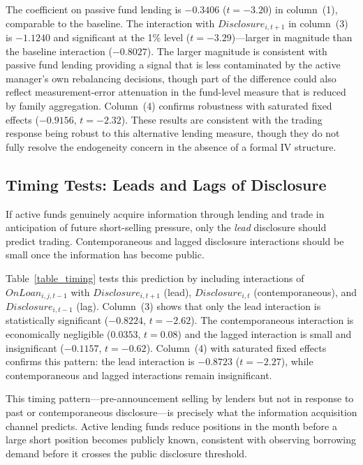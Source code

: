 The coefficient on passive fund lending is $-0.3406$ ($t = -3.20$) in column~(1), comparable to the baseline. The interaction with $\mathit{Disclosure}_{i,t+1}$ in column~(3) is $-1.1240$ and significant at the 1\% level ($t = -3.29$)---larger in magnitude than the baseline interaction ($-0.8027$). The larger magnitude is consistent with passive fund lending providing a signal that is less contaminated by the active manager's own rebalancing decisions, though part of the difference could also reflect measurement-error attenuation in the fund-level measure that is reduced by family aggregation. Column~(4) confirms robustness with saturated fixed effects ($-0.9156$, $t = -2.32$). These results are consistent with the trading response being robust to this alternative lending measure, though they do not fully resolve the endogeneity concern in the absence of a formal IV structure.

\subsection{Timing Tests: Leads and Lags of Disclosure}

If active funds genuinely acquire information through lending and trade in anticipation of future short-selling pressure, only the \textit{lead} disclosure should predict trading. Contemporaneous and lagged disclosure interactions should be small once the information has become public.

Table~\ref{table_timing} tests this prediction by including interactions of $OnLoan_{i,j,t-1}$ with $\mathit{Disclosure}_{i,t+1}$ (lead), $\mathit{Disclosure}_{i,t}$ (contemporaneous), and $\mathit{Disclosure}_{i,t-1}$ (lag). Column~(3) shows that only the lead interaction is statistically significant ($-0.8224$, $t = -2.62$). The contemporaneous interaction is economically negligible ($0.0353$, $t = 0.08$) and the lagged interaction is small and insignificant ($-0.1157$, $t = -0.62$). Column~(4) with saturated fixed effects confirms this pattern: the lead interaction is $-0.8723$ ($t = -2.27$), while contemporaneous and lagged interactions remain insignificant.

This timing pattern---pre-announcement selling by lenders but not in response to past or contemporaneous disclosure---is precisely what the information acquisition channel predicts. Active lending funds reduce positions in the month before a large short position becomes publicly known, consistent with observing borrowing demand before it crosses the public disclosure threshold.

